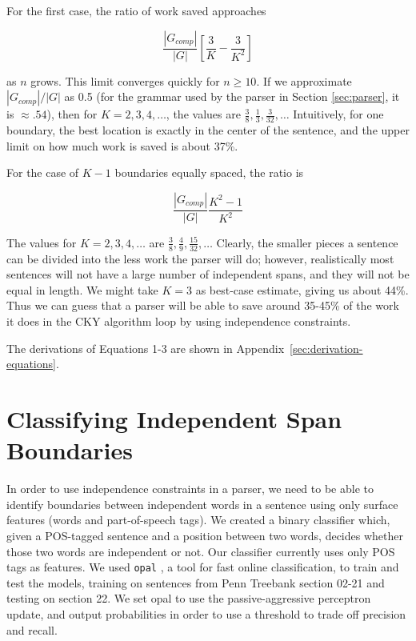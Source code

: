 \documentclass[11pt]{article}
\begin{document}
For the first case, the ratio of work saved approaches

\begin{equation}
\frac{|G_{comp}|}{|G|} \left[ \frac{3}{K} - \frac{3}{K^2} \right]
\end{equation}

as $n$ grows. This limit converges quickly for $n \ge 10$. If we
approximate $|G_{comp}|/|G|$ as 0.5 (for the grammar used by the parser in
Section \ref{sec:parser}, it is $\approx .54$), then for
$K=2,3,4,\dots$, the values are $\frac{3}{8}, \frac{1}{3}, \frac{3}{32}, \dots$
Intuitively, for one boundary, the best location
is exactly in the center of the sentence, and the upper limit on how
much work is saved is about 37\%.

For the case of $K-1$ boundaries equally spaced, the ratio is

\begin{equation}
\frac{|G_{comp}|}{|G|}\frac{K^2 - 1}{K^2}
\end{equation}

The values for $K=2,3,4,\dots$ are $\frac{3}{8}, \frac{4}{9}, \frac{15}{32}, \dots$
Clearly, the smaller pieces a sentence can be
divided into the less work the parser will do; however, realistically
most sentences will not have a large number of independent spans, and
they will not be equal in length. We might take $K=3$ as best-case
estimate, giving us about 44\%. Thus we can guess that a parser will be
able to save around 35-45\% of the work it does in the CKY algorithm
loop by using independence constraints.

The derivations of Equations 1-3 are shown in Appendix~\ref{sec:derivation-equations}.

\section{Classifying Independent Span Boundaries}
\label{sec-4}

In order to use independence constraints in a parser, we need to be
able to identify boundaries between independent words in a sentence
using only surface features (words and part-of-speech tags). We
created a binary classifier which, given a POS-tagged sentence and a
position between two words, decides whether those two words are
independent or not. Our classifier currently uses only POS tags as
features. We used \texttt{opal} \cite{Yoshinaga2010}, a tool for fast online
classification, to train and test the models, training on sentences
from Penn Treebank section 02-21 and testing on section 22. We set
opal to use the passive-aggressive perceptron update, and output
probabilities in order to use a threshold to trade off precision and
recall.
\end{document}
